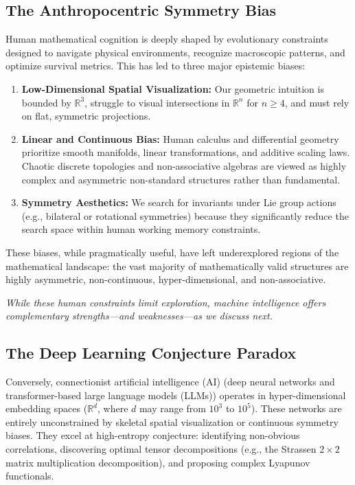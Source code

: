 \documentclass[11pt,a4paper]{book}
\begin{document}
\subsection{The Anthropocentric Symmetry Bias}
Human mathematical cognition is deeply shaped by evolutionary constraints designed to navigate physical environments, recognize macroscopic patterns, and optimize survival metrics. This has led to three major epistemic biases:
\begin{enumerate}
    \item \textbf{Low-Dimensional Spatial Visualization:} Our geometric intuition is bounded by $\mathbb{R}^3$, struggle to visual intersections in $\mathbb{R}^n$ for $n \geq 4$, and must rely on flat, symmetric projections.
    \item \textbf{Linear and Continuous Bias:} Human calculus and differential geometry prioritize smooth manifolds, linear transformations, and additive scaling laws. Chaotic discrete topologies and non-associative algebras are viewed as highly complex and asymmetric non-standard structures rather than fundamental.
    \item \textbf{Symmetry Aesthetics:} We search for invariants under Lie group actions (e.g., bilateral or rotational symmetries) because they significantly reduce the search space within human working memory constraints.
\end{enumerate}

These biases, while pragmatically useful, have left underexplored regions of the mathematical landscape: the vast majority of mathematically valid structures are highly asymmetric, non-continuous, hyper-dimensional, and non-associative.

\textit{While these human constraints limit exploration, machine intelligence offers complementary strengths---and weaknesses---as we discuss next.}

\subsection{The Deep Learning Conjecture Paradox}
Conversely, connectionist artificial intelligence (AI) (deep neural networks and transformer-based large language models (LLMs)) operates in hyper-dimensional embedding spaces ($\mathbb{R}^{d}$, where $d$ may range from $10^3$ to $10^5$). These networks are entirely unconstrained by skeletal spatial visualization or continuous symmetry biases. They excel at high-entropy conjecture: identifying non-obvious correlations, discovering optimal tensor decompositions (e.g., the Strassen $2 \times 2$ matrix multiplication decomposition), and proposing complex Lyapunov functionals.
\end{document}

